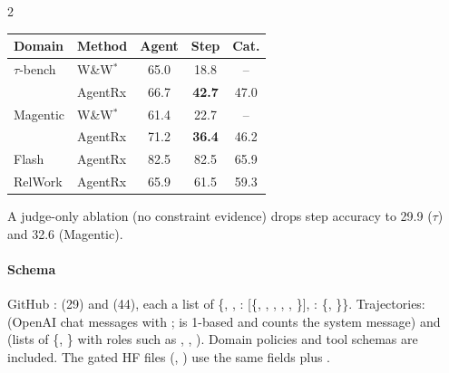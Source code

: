 \begin{multicols}{2}
\begin{center}\small
\begin{tabular}{@{}llccc@{}}\toprule
Domain & Method & Agent & Step & Cat.\\\midrule
$\tau$-bench & W\&W$^*$ & 65.0 & 18.8 & --\\
 & AgentRx & 66.7 & \textbf{42.7} & 47.0\\
Magentic & W\&W$^*$ & 61.4 & 22.7 & --\\
 & AgentRx & 71.2 & \textbf{36.4} & 46.2\\
Flash & AgentRx & 82.5 & 82.5 & 65.9\\
RelWork & AgentRx & 65.9 & 61.5 & 59.3\\\bottomrule
\end{tabular}
\end{center}
A judge-only ablation (no constraint evidence) drops step accuracy to 29.9 ($\tau$) and 32.6 (Magentic).

\paragraph{Schema} GitHub :  (29) and  (44), each a list of \{, , : [\{, , , , , \}], : \{, \}\}. Trajectories:  (OpenAI chat messages with ;  is 1-based and counts the system message) and  (lists of \{, \} with roles such as , , ). Domain policies and tool schemas are included. The gated HF files (, ) use the same fields plus .
\end{multicols}

